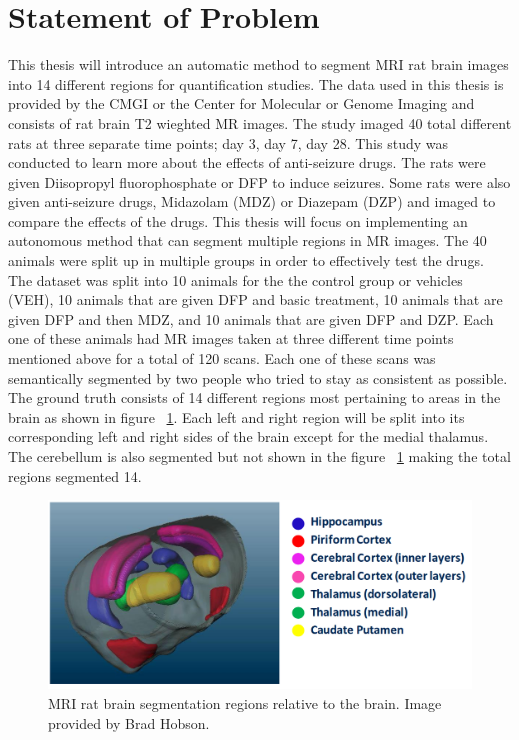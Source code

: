 \section{Statement of Problem}
        This thesis will introduce an automatic method to segment MRI rat brain images into 14 different regions for quantification studies. 
        The data used in this thesis is provided by the CMGI or the Center for Molecular or Genome Imaging and consists of rat brain T2 wieghted MR images. 
        The study imaged 40 total different rats at three separate time points; day 3, day 7, day 28. 
        This study was conducted to learn more about the effects of anti-seizure drugs.
        The rats were given Diisopropyl fluorophosphate or DFP to induce seizures. 
        Some rats were also given anti-seizure drugs, Midazolam (MDZ) or Diazepam (DZP) and imaged to compare the effects of the drugs.
        This thesis will focus on implementing an autonomous method that can segment multiple regions in MR images. 
        The 40 animals were split up in multiple groups in order to effectively test the drugs.
        The dataset was split into 10 animals for the the control group or vehicles (VEH), 10 animals that are given DFP and basic treatment, 10 animals that are given DFP and then MDZ, and 10 animals that are given DFP and DZP. 
        Each one of these animals had MR images taken at three different time points mentioned above for a total of 120 scans. 
        Each one of these scans was semantically segmented by two people who tried to stay as consistent as possible. 
        The ground truth consists of 14 different regions most pertaining to areas in the brain as shown in figure ~\ref{fig:segmentation regions}. Each left and right region will be split into its corresponding left and right sides of the brain except for the medial thalamus. The cerebellum is also segmented but not shown in the figure ~\ref{fig:segmentation regions} making the total regions segmented 14. 
        
\begin{figure}
  \centering
  \includegraphics[width=\linewidth]{segmentation_areas.png}
  \caption{MRI rat brain segmentation regions relative to the brain. Image provided by Brad Hobson. }
  \label{fig:segmentation regions}
\end{figure}
        
